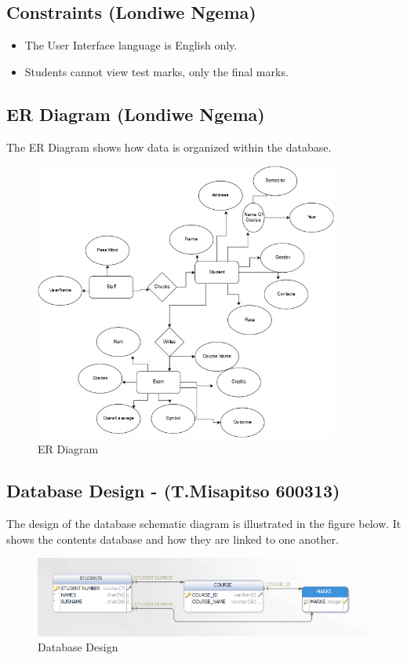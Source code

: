 \documentclass[10pt,onecolumn]{RequimentsGathering}
\begin{document}
	\subsection{Constraints (Londiwe Ngema)}
	\begin{itemize}
		\item The User Interface language is English only.
		\item Students cannot view test marks, only the final marks.
	\end{itemize}
	
	\newpage
	
	\subsection{ER Diagram (Londiwe Ngema)}
	The ER Diagram shows how data is organized within the database.
	
	\begin{center}
		\begin{figure}[h]
			\centering
			\includegraphics[width=10cm]{ER_DIAGRAM}
			\caption{ER Diagram}
		\end{figure}
	\end{center}
	
	
	\subsection{Database Design - (T.Misapitso 600313) }
	The design of the database schematic diagram is illustrated in the figure below. It shows the contents database and how they are linked to one another.
	
	\begin{center}
		\begin{figure}[h]
			\centering
			\includegraphics[scale=0.8, width=16cm]{Schematic}
			\caption{Database Design}
		\end{figure}
	\end{center}
	\newpage
	
\end{document}
